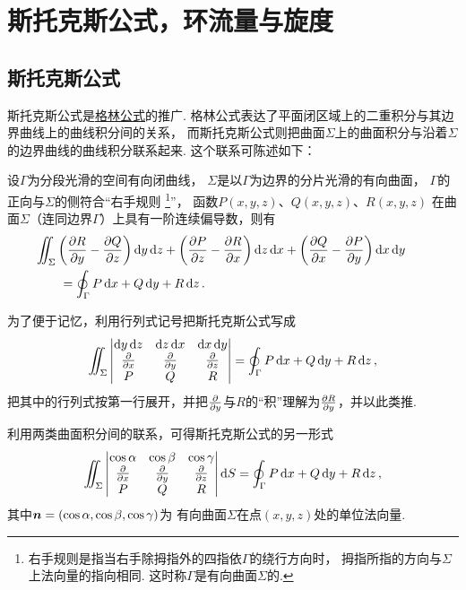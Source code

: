 \section{斯托克斯公式，环流量与旋度}
\subsection{斯托克斯公式}
斯托克斯公式是\hyperref[equation:线积分与面积分.格林公式]{格林公式}的推广.
格林公式表达了平面闭区域上的二重积分与其边界曲线上的曲线积分间的关系，
而斯托克斯公式则把曲面\(\Sigma\)上的曲面积分与沿着\(\Sigma\)的边界曲线的曲线积分联系起来.
这个联系可陈述如下：

\begin{theorem}[斯托克斯公式]
设\(\Gamma\)为分段光滑的空间有向闭曲线，
\(\Sigma\)是以\(\Gamma\)为边界的分片光滑的有向曲面，
\(\Gamma\)的正向与\(\Sigma\)的侧符合“右手规则%
\footnote{右手规则是指当右手除拇指外的四指依\(\Gamma\)的绕行方向时，
拇指所指的方向与\(\Sigma\)上法向量的指向相同.
这时称\(\Gamma\)是有向曲面\(\Sigma\)的.}”，
函数\(P(x,y,z)\)、\(Q(x,y,z)\)、\(R(x,y,z)\)
在曲面\(\Sigma\)（连同边界\(\Gamma\)）上具有一阶连续偏导数，则有
\begin{equation}\label{equation:线积分与面积分.斯托克斯公式}
	\begin{split}
		&\hspace{-20pt}\iint_\Sigma
			\left( \pdv{R}{y} - \pdv{Q}{z} \right)\dd{y}\dd{z}
			+\left( \pdv{P}{z} - \pdv{R}{x} \right)\dd{z}\dd{x}
			+\left( \pdv{Q}{x} - \pdv{P}{y} \right)\dd{x}\dd{y} \\
		&= \oint_\Gamma P\dd{x}+Q\dd{y}+R\dd{z}.
	\end{split}
\end{equation}
\end{theorem}

为了便于记忆，利用行列式记号把斯托克斯公式写成\[
	\iint_\Sigma \begin{vmatrix}
		\dd{y}\dd{z} & \dd{z}\dd{x} & \dd{x}\dd{y} \\
		\pdv{x} & \pdv{y} & \pdv{z} \\
		P & Q & R \\
	\end{vmatrix}
	= \oint_\Gamma P\dd{x}+Q\dd{y}+R\dd{z},
\]把其中的行列式按第一行展开，并把\(\pdv{y}\)与\(R\)的“积”理解为\(\pdv{R}{y}\)，并以此类推.

利用两类曲面积分间的联系，可得斯托克斯公式的另一形式\[
	\iint_\Sigma \begin{vmatrix}
		\cos\alpha & \cos\beta & \cos\gamma \\
		\pdv{x} & \pdv{y} & \pdv{z} \\
		P & Q & R \\
	\end{vmatrix} \dd{S}
	= \oint_\Gamma P\dd{x}+Q\dd{y}+R\dd{z},
\]
其中\(\boldsymbol{n}=(\cos\alpha,\cos\beta,\cos\gamma)\)为
有向曲面\(\Sigma\)在点\((x,y,z)\)处的单位法向量.

